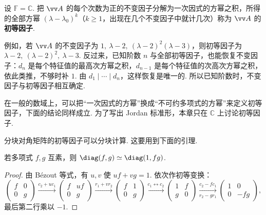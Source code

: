 	\begin{definition}
		设 $\mathbb{F}=\mathbb{C}$. 把 $\vv A$ 的每个次数为正的不变因子分解为一次因式的方幂之积，所得的全部方幂 $(\lambda-\lambda_0)^k$（$k\ge1$，出现在几个不变因子中就计几次）称为 $\vv A$ 的\textbf{初等因子}.
	\end{definition}
	
	例如，若 $\vv A$ 的不变因子为 $1,\ \lambda-2,\ (\lambda-2)^2(\lambda-3)$，则初等因子为 $\lambda-2,\ (\lambda-2)^2,\ \lambda-3$. 反过来，已知阶数 $n$ 与全部初等因子，也能恢复不变因子：$d_n$ 是每个特征值的最高次方幂之积，$d_{n-1}$ 是每个特征值的次高次方幂之积，依此类推，不够时补 $1$. 由 $d_1\mid\cdots\mid d_n$，这样恢复是唯一的. 所以已知阶数时，不变因子与初等因子相互确定.
	
	\begin{remark}
		在一般的数域上，可以把“一次因式的方幂”换成“不可约多项式的方幂”来定义初等因子，下面的结论同样成立. 为了写出 Jordan 标准形，本章只在 $\mathbb{C}$ 上讨论初等因子.
	\end{remark}
	
	分块对角矩阵的初等因子可以分块计算. 这要用到下面的引理.
	
	\begin{lemma}\label{lem:coprimesplit}
		若多项式 $f,g$ 互素，则 $\diag(f,g)\simeq\diag(1,fg)$.
	\end{lemma}
	\begin{proof}
		由 Bézout 等式，有 $u,v$ 使 $uf+vg=1$. 依次作初等变换：
		\[\begin{pmatrix}f&0\\0&g\end{pmatrix}\xrightarrow{c_2+uc_1}\begin{pmatrix}f&uf\\0&g\end{pmatrix}\xrightarrow{r_1+vr_2}\begin{pmatrix}f&1\\0&g\end{pmatrix}\xrightarrow{c_1\leftrightarrow c_2}\begin{pmatrix}1&f\\g&0\end{pmatrix}\xrightarrow[r_2-gr_1]{c_2-fc_1}\begin{pmatrix}1&0\\0&-fg\end{pmatrix},\]
		最后第二行乘以 $-1$.
	\end{proof}
	
